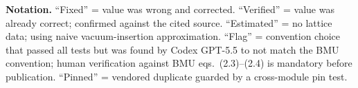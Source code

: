 \documentclass[11pt]{article}
\begin{document}
\vspace{1em}
\noindent
\textbf{Notation.}  ``Fixed'' = value was wrong and corrected.
``Verified'' = value was already correct; confirmed against the cited
source.  ``Estimated'' = no lattice data; using naive vacuum-insertion
approximation.  ``Flag'' = convention choice that passed all tests but
was found by Codex GPT-5.5 to not match the BMU convention; human verification against BMU eqs.~(2.3)--(2.4) is mandatory before publication.
``Pinned'' = vendored duplicate guarded by a cross-module pin test.
\end{document}
